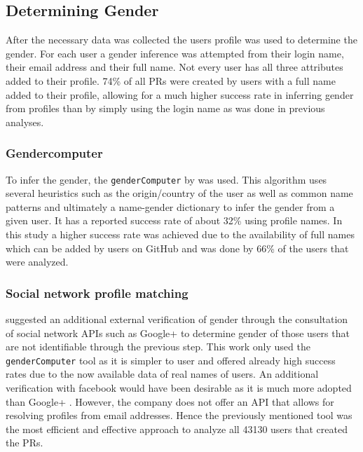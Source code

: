 \subsection{Determining Gender}
After the necessary data was collected the users profile was used to determine the gender. For each user a gender inference was attempted from their login name, their email address and their full name. Not every user has all three attributes added to their profile. 74\% of all \ac{PR}s were created by users with a full name added to their profile, allowing for a much higher success rate in inferring gender from profiles than by simply using the login name as was done in previous analyses.
\subsubsection{Gendercomputer}
To infer the gender, the \lstinline|genderComputer| by \citeauthor{vasilescu:2012:6542459} was used. This algorithm uses several heuristics such as the origin/country of the user as well as common name patterns and ultimately a name-gender dictionary to infer the gender from a given user. It has a reported success rate of about 32\% \cite{Vasilescu:2015:GTD:2702123.2702549} using profile names. In this study a higher success rate was achieved due to the availability of full names which can be added by users on GitHub and was done by 66\% of the users that were analyzed.

\subsubsection{Social network profile matching}
\citeauthor{genderdiff:2016} suggested an additional external verification of gender through the consultation of social network \ac{API}s such as Google+ to determine gender of those users that are not identifiable through the previous step.
This work only used the \lstinline|genderComputer| tool as it is simpler to user and offered already high success rates due to the now available data of real names of users. An additional verification with facebook would have been desirable as it is much more adopted than Google+ \cite{googleplusstats:2015,facebookstats:2017}. However, the company does not offer an \ac{API} that allows for resolving profiles from email addresses. Hence the previously mentioned tool was the most efficient and effective approach to analyze all 43130 users that created the \ac{PR}s.

